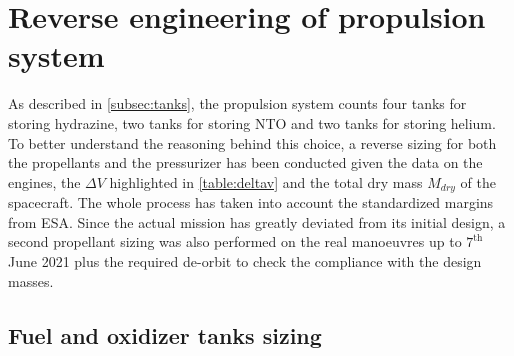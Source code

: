 \section{Reverse engineering of propulsion system}
\label{sec:reverse_prop}

As described in \autoref{subsec:tanks}, the propulsion system counts four tanks for storing hydrazine, two tanks for storing NTO and two tanks for storing helium.
To better understand the reasoning behind this choice, a reverse sizing for both the propellants and the pressurizer has been conducted given the data on the engines, the $\Delta V$ highlighted in \autoref{table:deltav} and the total dry mass $M_{dry}$ \cite{masses_ref} of the spacecraft.
The whole process has taken into account the standardized margins from ESA. \cite{esa_margins}
Since the actual mission has greatly deviated from its initial design, a second propellant sizing was also performed on the real manoeuvres up to $7^{\textrm{th}}$ June 2021 \cite{juno_inner} \cite{otm} \cite{prm_redesign} plus the required de-orbit to check the compliance with the design masses.

\subsection{Fuel and oxidizer tanks sizing}
\label{subsec:fuel_ox_sizing}

